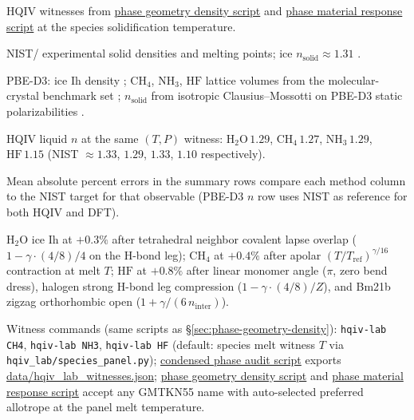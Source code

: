 \documentclass[11pt,notitlepage]{amsart}
\newcommand{\datafile}[1]{{\footnotesize\url{data/#1}}}
\begin{document}
\begin{table}[h]
\begin{threeparttable}
\begin{tablenotes}\small
\item HQIV witnesses from \hyperref[app:scripts]{phase geometry density script} and
  \hyperref[app:scripts]{phase material response script} at the species solidification temperature.
\item NIST/\cite{crc2023handbook} experimental solid densities and melting points; ice
  $n_{\mathrm{solid}}\approx 1.31$ \cite{petrenko2002ice,nistwebbook_h2o}.
\item PBE-D3: ice {Ih} density \cite{santra2013ice}; $\mathrm{CH_4}$, $\mathrm{NH_3}$,
  $\mathrm{HF}$ lattice volumes from the molecular-crystal benchmark set
  \cite{brandenburg2016jctc,grimme2011d3}; $n_{\mathrm{solid}}$ from isotropic
  Clausius--Mossotti on PBE-D3 static polarizabilities \cite{reilly2013mbd}.
\item HQIV liquid $n$ at the same $(T,P)$ witness:
  $\mathrm{H_2O}\,1.29$, $\mathrm{CH_4}\,1.27$, $\mathrm{NH_3}\,1.29$, $\mathrm{HF}\,1.15$
  (NIST $\approx 1.33$, $1.29$, $1.33$, $1.10$ respectively).
\item Mean absolute percent errors in the summary rows compare each method column to the
  NIST target for that observable (PBE-D3 $n$ row uses NIST as reference for both HQIV and DFT).
\item $\mathrm{H_2O}$ ice Ih at $+0.3\%$ after tetrahedral neighbor covalent lapse overlap
  ($1-\gamma\cdot(4/8)/4$ on the H-bond leg); $\mathrm{CH_4}$ at $+0.4\%$ after apolar
  $(T/T_{\mathrm{ref}})^{\gamma/16}$ contraction at melt $T$; $\mathrm{HF}$ at $+0.8\%$
  after linear monomer angle ($\pi$, zero bend dress), halogen strong H-bond leg compression
  ($1-\gamma\cdot(4/8)/Z$), and Bm21b zigzag orthorhombic open ($1+\gamma/(6\,n_{\mathrm{inter}})$).
\end{tablenotes}
\end{threeparttable}
\end{table}

Witness commands (same scripts as \S\ref{sec:phase-geometry-density}):
\texttt{hqiv-lab CH4}, \texttt{hqiv-lab NH3}, \texttt{hqiv-lab HF} (default:
species melt witness $T$ via \texttt{hqiv\_lab/species\_panel.py});
\hyperref[app:scripts]{condensed phase audit script} exports
\datafile{hqiv_lab_witnesses.json};
\hyperref[app:scripts]{phase geometry density script} and
\hyperref[app:scripts]{phase material response script} accept any GMTKN55 name with
auto-selected preferred allotrope at the panel melt temperature.
\end{document}

